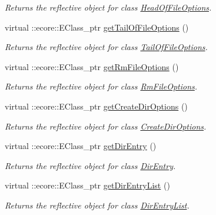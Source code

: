 \begin{DoxyCompactItemize}
\begin{DoxyCompactList}\small\item\em Returns the reflective object for class \hyperlink{classFMS__Data_1_1HeadOfFileOptions}{HeadOfFileOptions}. \item\end{DoxyCompactList}\item 
virtual ::ecore::EClass\_\-ptr \hyperlink{classFMS__Data_1_1FMS__DataPackage_a97eafb0b2c3a9c7449e038fb5d91f263}{getTailOfFileOptions} ()
\begin{DoxyCompactList}\small\item\em Returns the reflective object for class \hyperlink{classFMS__Data_1_1TailOfFileOptions}{TailOfFileOptions}. \item\end{DoxyCompactList}\item 
virtual ::ecore::EClass\_\-ptr \hyperlink{classFMS__Data_1_1FMS__DataPackage_a8e54afc374c3126e59ecfd193dc56861}{getRmFileOptions} ()
\begin{DoxyCompactList}\small\item\em Returns the reflective object for class \hyperlink{classFMS__Data_1_1RmFileOptions}{RmFileOptions}. \item\end{DoxyCompactList}\item 
virtual ::ecore::EClass\_\-ptr \hyperlink{classFMS__Data_1_1FMS__DataPackage_a719ce5102d9e6da15d3fadaadf0e6de6}{getCreateDirOptions} ()
\begin{DoxyCompactList}\small\item\em Returns the reflective object for class \hyperlink{classFMS__Data_1_1CreateDirOptions}{CreateDirOptions}. \item\end{DoxyCompactList}\item 
virtual ::ecore::EClass\_\-ptr \hyperlink{classFMS__Data_1_1FMS__DataPackage_a3cd5a8b84b819633aaaf68fd785e1dcd}{getDirEntry} ()
\begin{DoxyCompactList}\small\item\em Returns the reflective object for class \hyperlink{classFMS__Data_1_1DirEntry}{DirEntry}. \item\end{DoxyCompactList}\item 
virtual ::ecore::EClass\_\-ptr \hyperlink{classFMS__Data_1_1FMS__DataPackage_ad75cff68b200bc90c72feb277daa7dda}{getDirEntryList} ()
\begin{DoxyCompactList}\small\item\em Returns the reflective object for class \hyperlink{classFMS__Data_1_1DirEntryList}{DirEntryList}. \item\end{DoxyCompactList}\item 

\end{DoxyCompactItemize}
